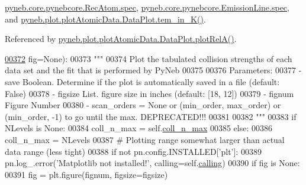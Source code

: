 \hyperlink{pynebcore_8py_source_l02566}{pyneb.\+core.\+pynebcore.\+Rec\+Atom.\+spec}, \hyperlink{pynebcore_8py_source_l03268}{pyneb.\+core.\+pynebcore.\+Emission\+Line.\+spec}, and \hyperlink{plot_atomic_data_8py_source_l00464}{pyneb.\+plot.\+plot\+Atomic\+Data.\+Data\+Plot.\+tem\+\_\+in\+\_\+\+K()}.



Referenced by \hyperlink{plot_atomic_data_8py_source_l00261}{pyneb.\+plot.\+plot\+Atomic\+Data.\+Data\+Plot.\+plot\+Rel\+A()}.


\begin{DoxyCode}
\hypertarget{classpyneb_1_1plot_1_1plot_atomic_data_1_1_data_plot_l00372}{}\hyperlink{classpyneb_1_1plot_1_1plot_atomic_data_1_1_data_plot_a674c04e8512a9f5724c2af0df4e0a8fe}{00372}                   fig=\textcolor{keywordtype}{None}):
00373         \textcolor{stringliteral}{"""}
00374 \textcolor{stringliteral}{        Plot the tabulated collision strengths of each data set and the fit that is performed by PyNeb}
00375 \textcolor{stringliteral}{        }
00376 \textcolor{stringliteral}{        Parameters:}
00377 \textcolor{stringliteral}{            - save     Boolean. Determine if the plot is automatically saved in a file (default: False)}
00378 \textcolor{stringliteral}{            - figsize  List. figure size in inches (default: [18, 12])}
00379 \textcolor{stringliteral}{            - fignum   Figure Number}
00380 \textcolor{stringliteral}{            - scan\_orders = None or (min\_order, max\_order) or (min\_order, -1) to go until the max.
       DEPRECATED!!!}
00381 \textcolor{stringliteral}{}
00382 \textcolor{stringliteral}{        """}
00383         \textcolor{keywordflow}{if} NLevels \textcolor{keywordflow}{is} \textcolor{keywordtype}{None}:
00384             coll\_n\_max = self.\hyperlink{classpyneb_1_1plot_1_1plot_atomic_data_1_1_data_plot_aa15b01aa8da5eac903d797c2a1af3461}{coll\_n\_max}
00385         \textcolor{keywordflow}{else}:
00386             coll\_n\_max = NLevels
00387         \textcolor{comment}{# Plotting range somewhat larger than actual data range (less tight) }
00388         \textcolor{keywordflow}{if} \textcolor{keywordflow}{not} pn.config.INSTALLED[\textcolor{stringliteral}{'plt'}]:
00389             pn.log\_.error(\textcolor{stringliteral}{'Matplotlib not installed!'}, calling=self.\hyperlink{classpyneb_1_1plot_1_1plot_atomic_data_1_1_data_plot_a393a133b607541c57d5ebc5a34687e3f}{calling})
00390         \textcolor{keywordflow}{if} fig \textcolor{keywordflow}{is} \textcolor{keywordtype}{None}:
00391             fig = plt.figure(fignum, figsize=figsize)

\end{DoxyCode}
